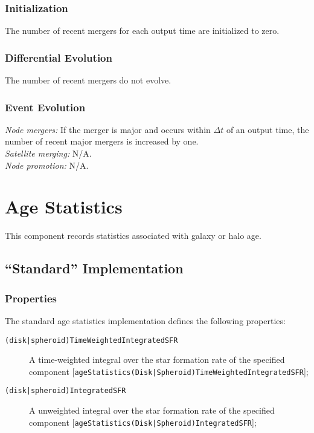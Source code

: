 \subsubsection{Initialization}

The number of recent mergers for each output time are initialized to zero.

\subsubsection{Differential Evolution}

The number of recent mergers do not evolve.

\subsubsection{Event Evolution}

\noindent\emph{Node mergers:} If the merger is major and occurs within $\Delta t$ of an output time, the number of recent major mergers is increased by one.\\

\noindent\emph{Satellite merging:} N/A.\\

\noindent\emph{Node promotion:} N/A.\\

\section{Age Statistics}

This \gls{component} records statistics associated with galaxy or halo age.

\subsection{``Standard'' Implementation}

\subsubsection{Properties}

The standard age statistics implementation defines the following properties:
\begin{description}
 \item [{\tt (disk|spheroid)TimeWeightedIntegratedSFR}] A time-weighted integral over the star formation rate of the specified component [{\tt ageStatistics(Disk|Spheroid)TimeWeightedIntegratedSFR}];
 \item [{\tt (disk|spheroid)IntegratedSFR}] A unweighted integral over the star formation rate of the specified component [{\tt ageStatistics(Disk|Spheroid)IntegratedSFR}];
\end{description}

